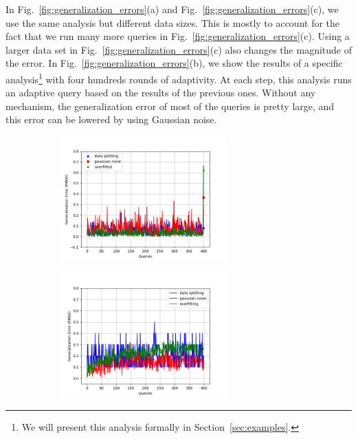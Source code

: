 In Fig.~\ref{fig:generalization_errors}(a) and Fig.~\ref{fig:generalization_errors}(c), we  use the same analysis but different data sizes. This is mostly to account for 
the fact that we run many more queries in Fig.~\ref{fig:generalization_errors}(c). Using a larger data set in Fig.~\ref{fig:generalization_errors}(c) also changes the magnitude of the error. 
In Fig.~\ref{fig:generalization_errors}(b), we show the results of a specific analysis\footnote{We will present this analysis formally in Section~\ref{sec:examples}.} with four hundreds rounds of adaptivity.
At each step, this analysis runs an adaptive query based on the results of the previous ones. Without any mechanism, the generalization error of most of the queries is pretty large, and this error can be lowered by using Gaussian noise. 
{\small
\begin{figure}
\centering
\begin{subfigure}{.322\textwidth}
\begin{centering}
\includegraphics[width=0.7\textwidth]{tworound.png}
\caption{}
\end{centering}
\end{subfigure}
\quad
\begin{subfigure}{.322\textwidth}
\begin{centering}
\includegraphics[width=0.7\textwidth]{multipleround.png}

\end{centering}
\end{subfigure}
\end{figure}}
